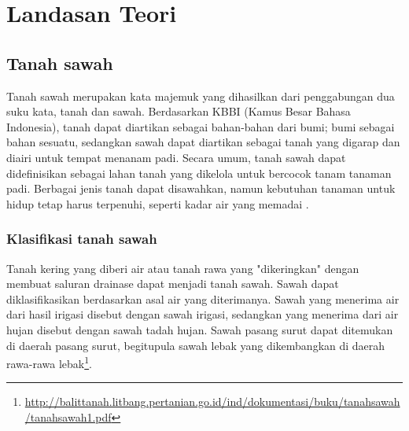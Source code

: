 \chapter{Landasan Teori}
\label{chap:teori}

\section{Tanah sawah}
\label{sec:skripsi} 
  Tanah sawah merupakan kata majemuk yang dihasilkan dari penggabungan dua suku kata, tanah dan sawah. Berdasarkan KBBI (Kamus Besar Bahasa Indonesia), tanah dapat diartikan sebagai bahan-bahan dari bumi; bumi sebagai bahan sesuatu, sedangkan sawah dapat diartikan sebagai tanah yang digarap dan diairi untuk tempat menanam padi. Secara umum, tanah sawah dapat didefinisikan sebagai lahan tanah yang dikelola untuk bercocok tanam tanaman padi. Berbagai jenis tanah dapat disawahkan, namun kebutuhan tanaman untuk hidup tetap harus terpenuhi, seperti kadar air yang memadai \cite{pujiarti:18:sawah}. 
  

\subsection{Klasifikasi tanah sawah}
\label{sec:latex}

Tanah kering yang diberi air atau tanah rawa yang "dikeringkan" dengan membuat saluran drainase dapat menjadi tanah sawah. Sawah dapat diklasifikasikan berdasarkan asal air yang diterimanya. Sawah yang menerima air dari hasil irigasi disebut dengan sawah irigasi, sedangkan yang menerima dari air hujan disebut dengan sawah tadah hujan. Sawah pasang surut dapat ditemukan di daerah pasang surut, begitupula sawah lebak yang dikembangkan di daerah rawa-rawa lebak\footnote{\url{http://balittanah.litbang.pertanian.go.id/ind/dokumentasi/buku/tanahsawah/tanahsawah1.pdf}}\cite{luh:07:kualitastanah}.

